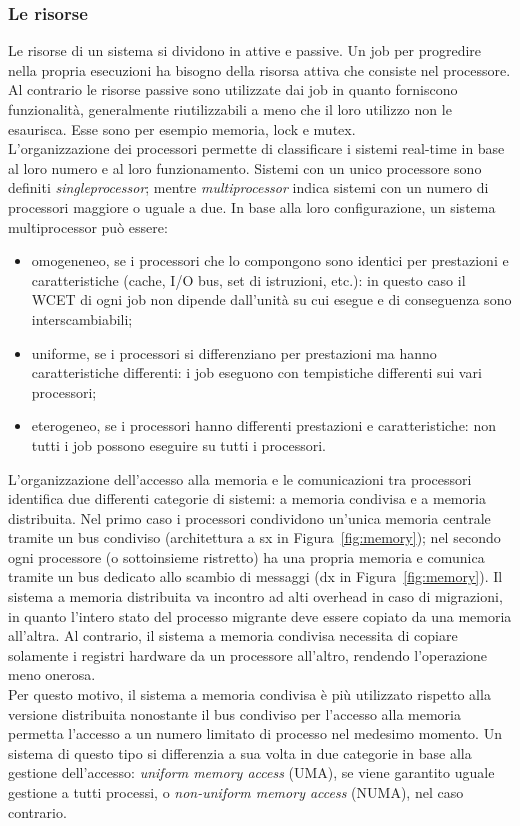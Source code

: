 \subsubsection{Le risorse}
\label{sec:overviewRM}

Le risorse di un sistema si dividono in attive e passive. Un job per progredire nella propria esecuzioni ha bisogno della risorsa attiva che consiste nel processore. Al contrario le risorse passive sono utilizzate dai job in quanto forniscono funzionalità, generalmente riutilizzabili a meno che il loro utilizzo non le esaurisca. Esse sono per esempio memoria, lock e mutex.\\

L'organizzazione dei processori permette di classificare i sistemi real-time in base al loro numero e al loro funzionamento. Sistemi con un unico processore sono definiti \textit{singleprocessor}; mentre \textit{multiprocessor} indica sistemi con un numero di processori maggiore o uguale a due. In base alla loro configurazione, un sistema multiprocessor può essere:

\begin{itemize}
	\item omogeneneo, se i processori che lo compongono sono identici per prestazioni e caratteristiche (cache, I/O bus, set di istruzioni, etc.): in questo caso il WCET di ogni job non dipende dall'unità su cui esegue e di conseguenza sono interscambiabili;
	\item uniforme, se i processori si differenziano per prestazioni ma hanno caratteristiche differenti: i job eseguono con tempistiche differenti sui vari processori;
	\item eterogeneo, se i processori hanno differenti prestazioni e caratteristiche: non tutti i job possono eseguire su tutti i processori.
\end{itemize}

L'organizzazione dell'accesso alla memoria e le comunicazioni tra processori identifica due differenti categorie di sistemi: a memoria condivisa e a memoria distribuita. Nel primo caso i processori condividono un'unica memoria centrale tramite un bus condiviso (architettura a sx in Figura~\ref{fig:memory}); nel secondo ogni processore (o sottoinsieme ristretto) ha una propria memoria e comunica tramite un bus dedicato allo scambio di messaggi (dx in Figura~\ref{fig:memory}). Il sistema a memoria distribuita va incontro ad alti overhead in caso di migrazioni, in quanto l'intero stato del processo migrante deve essere copiato da una memoria all'altra. Al contrario, il sistema a memoria condivisa necessita di copiare solamente i registri hardware da un processore all'altro, rendendo l'operazione meno onerosa.\\
Per questo motivo, il sistema a memoria condivisa è più utilizzato rispetto alla versione distribuita nonostante il bus condiviso per l'accesso alla memoria permetta l'accesso a un numero limitato di processo nel medesimo momento. Un sistema di questo tipo si differenzia a sua volta in due categorie in base alla gestione dell'accesso: \textit{uniform memory access} (UMA), se viene garantito uguale gestione a tutti processi, o \textit{non-uniform memory access} (NUMA), nel caso contrario.\\

